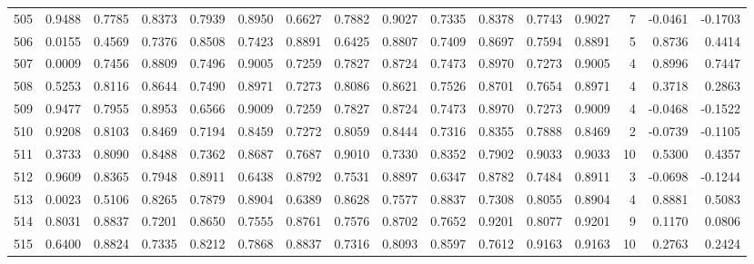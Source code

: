 \begin{tabular}{lrrrrrrrrrrrrrrr}
505 &      0.9488 &  0.7785 &  0.8373 &  0.7939 &  0.8950 &  0.6627 &  0.7882 &  0.9027 &  0.7335 &  0.8378 &   0.7743 &     0.9027 &      7 &                   -0.0461 &                    -0.1703 \\
506 &      0.0155 &  0.4569 &  0.7376 &  0.8508 &  0.7423 &  0.8891 &  0.6425 &  0.8807 &  0.7409 &  0.8697 &   0.7594 &     0.8891 &      5 &                    0.8736 &                     0.4414 \\
507 &      0.0009 &  0.7456 &  0.8809 &  0.7496 &  0.9005 &  0.7259 &  0.7827 &  0.8724 &  0.7473 &  0.8970 &   0.7273 &     0.9005 &      4 &                    0.8996 &                     0.7447 \\
508 &      0.5253 &  0.8116 &  0.8644 &  0.7490 &  0.8971 &  0.7273 &  0.8086 &  0.8621 &  0.7526 &  0.8701 &   0.7654 &     0.8971 &      4 &                    0.3718 &                     0.2863 \\
509 &      0.9477 &  0.7955 &  0.8953 &  0.6566 &  0.9009 &  0.7259 &  0.7827 &  0.8724 &  0.7473 &  0.8970 &   0.7273 &     0.9009 &      4 &                   -0.0468 &                    -0.1522 \\
510 &      0.9208 &  0.8103 &  0.8469 &  0.7194 &  0.8459 &  0.7272 &  0.8059 &  0.8444 &  0.7316 &  0.8355 &   0.7888 &     0.8469 &      2 &                   -0.0739 &                    -0.1105 \\
511 &      0.3733 &  0.8090 &  0.8488 &  0.7362 &  0.8687 &  0.7687 &  0.9010 &  0.7330 &  0.8352 &  0.7902 &   0.9033 &     0.9033 &     10 &                    0.5300 &                     0.4357 \\
512 &      0.9609 &  0.8365 &  0.7948 &  0.8911 &  0.6438 &  0.8792 &  0.7531 &  0.8897 &  0.6347 &  0.8782 &   0.7484 &     0.8911 &      3 &                   -0.0698 &                    -0.1244 \\
513 &      0.0023 &  0.5106 &  0.8265 &  0.7879 &  0.8904 &  0.6389 &  0.8628 &  0.7577 &  0.8837 &  0.7308 &   0.8055 &     0.8904 &      4 &                    0.8881 &                     0.5083 \\
514 &      0.8031 &  0.8837 &  0.7201 &  0.8650 &  0.7555 &  0.8761 &  0.7576 &  0.8702 &  0.7652 &  0.9201 &   0.8077 &     0.9201 &      9 &                    0.1170 &                     0.0806 \\
515 &      0.6400 &  0.8824 &  0.7335 &  0.8212 &  0.7868 &  0.8837 &  0.7316 &  0.8093 &  0.8597 &  0.7612 &   0.9163 &     0.9163 &     10 &                    0.2763 &                     0.2424 \\

\end{tabular}
